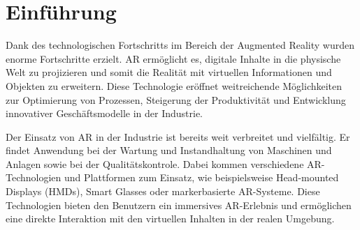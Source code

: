 \section{Einführung}

Dank des technologischen Fortschritts im Bereich der Augmented Reality wurden
enorme Fortschritte erzielt. AR ermöglicht es, digitale Inhalte in die
physische Welt zu projizieren und somit die Realität mit virtuellen
Informationen und Objekten zu erweitern. Diese Technologie eröffnet
weitreichende Möglichkeiten zur Optimierung von Prozessen, Steigerung der
Produktivität und Entwicklung innovativer Geschäftsmodelle in der Industrie.

Der Einsatz von AR in der Industrie ist bereits weit verbreitet und vielfältig.
Er findet Anwendung bei der Wartung und Instandhaltung von Maschinen und
Anlagen sowie bei der Qualitätskontrole. Dabei kommen verschiedene
AR-Technologien und Plattformen zum Einsatz, wie beispielsweise Head-mounted
Displays (HMDs), Smart Glasses oder markerbasierte AR-Systeme. Diese
Technologien bieten den Benutzern ein immersives AR-Erlebnis und ermöglichen
eine direkte Interaktion mit den virtuellen Inhalten in der realen Umgebung.\\